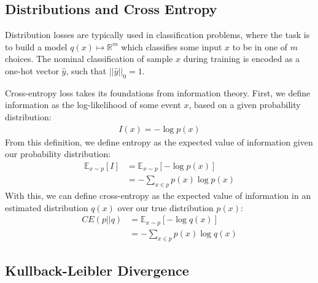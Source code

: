 \documentclass[paper=a4, fontsize=12pt]{scrartcl} %
\numberwithin{equation}{section} %
\numberwithin{figure}{section} %
\numberwithin{table}{section} %
\begin{document}
\subsection{Distributions and Cross Entropy}

Distribution losses are typically used in classification problems, where the task is to build a model $q(x) \mapsto \mathbb{R}^m$ which classifies some 
input $x$ to be in one of $m$ choices. The nominal classification of sample $x$ during training is encoded as a one-hot vector $\hat{y}$, such that $||\hat{y}||_0 = 1$.

Cross-entropy loss takes its foundations from 
information theory. First, we define information as the log-likelihood of some event $x$, based on a given probability distribution:
\begin{align*}
    I(x) = -\log p(x)
\end{align*}
From this definition, we define entropy as the expected value of information given our probability distribution:
\begin{align*}
    \mathbb{E}_{x \sim p}[I] &= \mathbb{E}_{x \sim p} \left[ -\log p(x) \right] \\
    &= -\sum_{x \in p} p(x) \log p(x)
\end{align*}
With this, we can define cross-entropy as the expected value of information in an estimated distribution $q(x)$ over our true distribution $p(x)$:
\begin{align*}
    CE(p || q) &= \mathbb{E}_{x \sim p} \left[ -\log q(x) \right] \\
    &= -\sum_{x \in p} p(x) \log q(x)
\end{align*}

\subsection{Kullback-Leibler Divergence}
\end{document}
